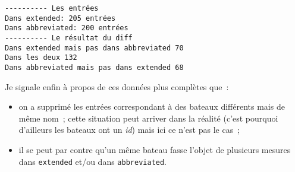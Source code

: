     \begin{Verbatim}[commandchars=\\\{\},frame=single,framerule=0.3mm,rulecolor=\color{cellframecolor}]
---------- Les entrées
Dans extended: 205 entrées
Dans abbreviated: 200 entrées
---------- Le résultat du diff
Dans extended mais pas dans abbreviated 70
Dans les deux 132
Dans abbreviated mais pas dans extended 68
\end{Verbatim}

    Je signale enfin à propos de ces données plus complètes que~:

\begin{itemize}
\tightlist
\item
  on a supprimé les entrées correspondant à des bateaux différents mais
  de même nom~; cette situation peut arriver dans la réalité (c'est
  pourquoi d'ailleurs les bateaux ont un \emph{id}) mais ici ce n'est
  pas le cas~;
\item
  il se peut par contre qu'un même bateau fasse l'objet de plusieurs
  mesures dans \texttt{extended} et/ou dans \texttt{abbreviated}.
\end{itemize}


    
    
    
